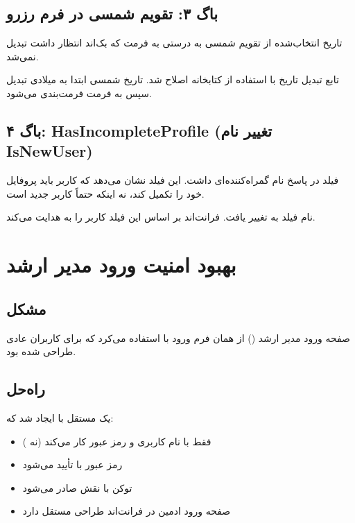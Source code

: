 \documentclass[12pt, a4paper]{article}
\begin{document}
\subsection{باگ ۳: تقویم شمسی در فرم رزرو}
\begin{description}[rightmargin=0.5cm]
  \item[مشکل:] تاریخ انتخاب‌شده از تقویم شمسی به درستی به فرمت  که
    بک‌اند انتظار داشت تبدیل نمی‌شد.
  \item[راه‌حل:] تابع تبدیل تاریخ با استفاده از کتابخانه  اصلاح شد.
    تاریخ شمسی ابتدا به میلادی تبدیل سپس به فرمت  فرمت‌بندی می‌شود.
\end{description}

\subsection{باگ ۴: HasIncompleteProfile (تغییر نام IsNewUser)}
\begin{description}[rightmargin=0.5cm]
  \item[مشکل:] فیلد  در پاسخ  نام گمراه‌کننده‌ای داشت.
    این فیلد نشان می‌دهد که کاربر باید پروفایل خود را تکمیل کند، نه اینکه حتماً
    کاربر جدید است.
  \item[راه‌حل:] نام فیلد به  تغییر یافت.
    فرانت‌اند بر اساس این فیلد کاربر را به  هدایت می‌کند.
\end{description}

\newpage

\section{بهبود امنیت ورود مدیر ارشد}

\subsection{مشکل}
صفحه ورود مدیر ارشد () از همان فرم ورود با 
استفاده می‌کرد که برای کاربران عادی طراحی شده بود.

\subsection{راه‌حل}
یک  مستقل  با 
ایجاد شد که:
\begin{itemize}[rightmargin=0.5cm]
  \item فقط با نام کاربری و رمز عبور کار می‌کند (نه )
  \item رمز عبور با  تأیید می‌شود
  \item توکن با نقش  صادر می‌شود
  \item صفحه ورود ادمین در فرانت‌اند طراحی مستقل دارد
\end{itemize}
\end{document}
